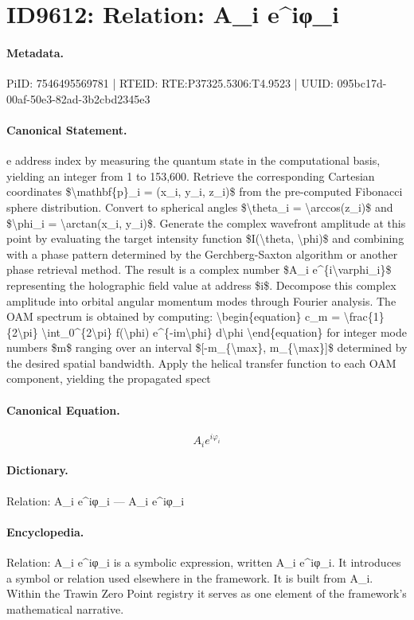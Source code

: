 \section*{ID9612: Relation: A\_i e\textasciicircum{}iφ\_i}
\paragraph{Metadata.}
PiID: 7546495569781 | RTEID: RTE:P37325.5306:T4.9523 | UUID: 095bc17d-00af-50e3-82ad-3b2cbd2345e3

\paragraph{Canonical Statement.}
e address index by measuring the quantum state in the computational basis, yielding an integer from 1 to 153,600. Retrieve the corresponding Cartesian coordinates \$\textbackslash{}mathbf\{p\}\_i = (x\_i, y\_i, z\_i)\$ from the pre-computed Fibonacci sphere distribution. Convert to spherical angles \$\textbackslash{}theta\_i = \textbackslash{}arccos(z\_i)\$ and \$\textbackslash{}phi\_i = \textbackslash{}arctan(x\_i, y\_i)\$. Generate the complex wavefront amplitude at this point by evaluating the target intensity function \$I(\textbackslash{}theta, \textbackslash{}phi)\$ and combining with a phase pattern determined by the Gerchberg-Saxton algorithm or another phase retrieval method. The result is a complex number \$A\_i e\textasciicircum{}\{i\textbackslash{}varphi\_i\}\$ representing the holographic field value at address \$i\$. Decompose this complex amplitude into orbital angular momentum modes through Fourier analysis. The OAM spectrum is obtained by computing: \textbackslash{}begin\{equation\} c\_m = \textbackslash{}frac\{1\}\{2\textbackslash{}pi\} \textbackslash{}int\_0\textasciicircum{}\{2\textbackslash{}pi\} f(\textbackslash{}phi) e\textasciicircum{}\{-im\textbackslash{}phi\} d\textbackslash{}phi \textbackslash{}end\{equation\} for integer mode numbers \$m\$ ranging over an interval \$[-m\_\{\textbackslash{}max\}, m\_\{\textbackslash{}max\}]\$ determined by the desired spatial bandwidth. Apply the helical transfer function to each OAM component, yielding the propagated spect

\paragraph{Canonical Equation.}
\[
A_i e^{i\varphi_i}
\]

\paragraph{Dictionary.}
Relation: A\_i e\textasciicircum{}iφ\_i — A\_i e\textasciicircum{}iφ\_i

\paragraph{Encyclopedia.}
Relation: A\_i e\textasciicircum{}iφ\_i is a symbolic expression, written A\_i e\textasciicircum{}iφ\_i. It introduces a symbol or relation used elsewhere in the framework. It is built from A\_i. Within the Trawin Zero Point registry it serves as one element of the framework's mathematical narrative.
